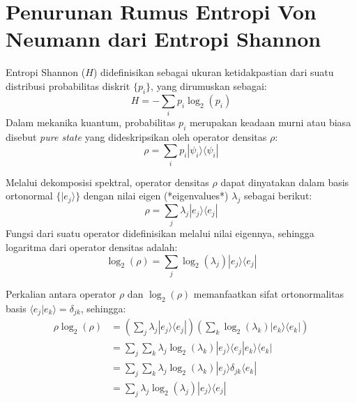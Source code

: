 \chapter{Penurunan Rumus Entropi Von Neumann dari Entropi Shannon}
\label{appendix:entropy_derivation}
Entropi Shannon ($H$) didefinisikan sebagai ukuran ketidakpastian dari suatu distribusi probabilitas diskrit $\{p_i\}$, yang dirumuskan sebagai:
\begin{equation}
    H = - \sum_i p_i \log_2 (p_i)
\end{equation}
Dalam mekanika kuantum, probabilitas $p_i$ merupakan keadaan murni atau biasa disebut \textit{pure state} yang dideskripsikan oleh operator densitas $\rho$:
\begin{equation}
    \rho = \sum_i p_i |\psi_i\rangle \langle \psi_i|
\end{equation}

Melalui dekomposisi spektral, operator densitas $\rho$ dapat dinyatakan dalam basis ortonormal $\{|e_j\rangle\}$ dengan nilai eigen (*eigenvalues*) $\lambda_j$ sebagai berikut:
\begin{equation}
    \rho = \sum_j \lambda_j |e_j\rangle \langle e_j|
\end{equation}
Fungsi dari suatu operator didefinisikan melalui nilai eigennya, sehingga logaritma dari operator densitas adalah:
\begin{equation}
    \log_2(\rho) = \sum_j \log_2 (\lambda_j) |e_j\rangle \langle e_j|
\end{equation}

Perkalian antara operator $\rho$ dan $\log_2(\rho)$ memanfaatkan sifat ortonormalitas basis $\langle e_j | e_k \rangle = \delta_{jk}$, sehingga:
\begin{equation}
\begin{split}
    \rho \log_2(\rho) &= \left(\sum_j \lambda_j |e_j\rangle \langle e_j|\right) \left( \sum_k \log_2 (\lambda_k) |e_k\rangle \langle e_k|\right) \\
    &= \sum_j \sum_k \lambda_j \log_2(\lambda_k) |e_j\rangle \langle e_j | e_k\rangle \langle e_k| \\
    &= \sum_j \sum_k \lambda_j \log_2(\lambda_k) |e_j\rangle \delta_{jk} \langle e_k| \\
    &= \sum_j \lambda_j \log_2(\lambda_j) |e_j\rangle \langle e_j|
\end{split}
\end{equation}

